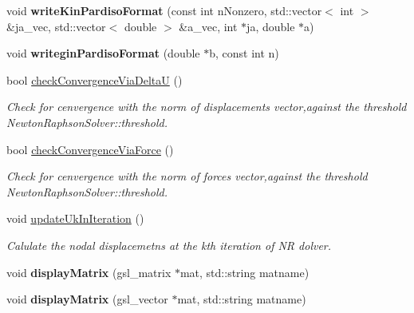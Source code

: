 \begin{DoxyCompactItemize}
\item 
\hypertarget{classNewtonRaphsonSolver_aa1821e3689ccc552557a6704bcd1e1b4}{}void {\bfseries write\+Kin\+Pardiso\+Format} (const int n\+Nonzero, std\+::vector$<$ int $>$ \&ja\+\_\+vec, std\+::vector$<$ double $>$ \&a\+\_\+vec, int $\ast$ja, double $\ast$a)\label{classNewtonRaphsonSolver_aa1821e3689ccc552557a6704bcd1e1b4}

\item 
\hypertarget{classNewtonRaphsonSolver_a78957a2905c38a9170a5c27d6f49326d}{}void {\bfseries writegin\+Pardiso\+Format} (double $\ast$b, const int n)\label{classNewtonRaphsonSolver_a78957a2905c38a9170a5c27d6f49326d}

\item 
bool \hyperlink{classNewtonRaphsonSolver_a3653a563e32649e0c90407aa089a995b}{check\+Convergence\+Via\+Delta\+U} ()
\begin{DoxyCompactList}\small\item\em Check for cenvergence with the norm of displacements vector,against the threshold Newton\+Raphson\+Solver\+::threshold. \end{DoxyCompactList}\item 
bool \hyperlink{classNewtonRaphsonSolver_a16edb5206c079476a0d6c2c956c65f25}{check\+Convergence\+Via\+Force} ()
\begin{DoxyCompactList}\small\item\em Check for cenvergence with the norm of forces vector,against the threshold Newton\+Raphson\+Solver\+::threshold. \end{DoxyCompactList}\item 
void \hyperlink{classNewtonRaphsonSolver_a5e457b3608c6fbd71767cd6eed07b2f7}{update\+Uk\+In\+Iteration} ()
\begin{DoxyCompactList}\small\item\em Calulate the nodal displacemetns at the kth iteration of N\+R dolver. \end{DoxyCompactList}\item 
\hypertarget{classNewtonRaphsonSolver_a3f873749f4a94498ddbc5d3648c5c404}{}void {\bfseries display\+Matrix} (gsl\+\_\+matrix $\ast$mat, std\+::string matname)\label{classNewtonRaphsonSolver_a3f873749f4a94498ddbc5d3648c5c404}

\item 
\hypertarget{classNewtonRaphsonSolver_a7e33c406f4e366b2d3c2e4b5d650a1ba}{}void {\bfseries display\+Matrix} (gsl\+\_\+vector $\ast$mat, std\+::string matname)\label{classNewtonRaphsonSolver_a7e33c406f4e366b2d3c2e4b5d650a1ba}


\end{DoxyCompactItemize}
